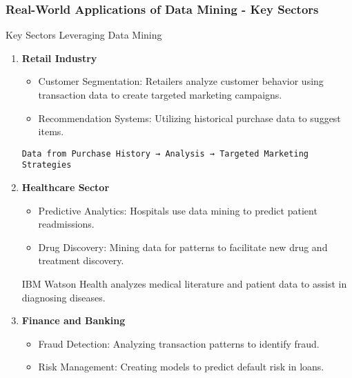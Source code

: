 \documentclass[aspectratio=169]{beamer}
\begin{document}
\begin{frame}[fragile]
    \frametitle{Real-World Applications of Data Mining - Key Sectors}
    \begin{block}{Key Sectors Leveraging Data Mining}
        \begin{enumerate}
            \item \textbf{Retail Industry}
                \begin{itemize}
                    \item Customer Segmentation: Retailers analyze customer behavior using transaction data to create targeted marketing campaigns.
                    \item Recommendation Systems: Utilizing historical purchase data to suggest items.
                \end{itemize}
                \begin{example}
                    \texttt{Data from Purchase History → Analysis → Targeted Marketing Strategies}
                \end{example}

            \item \textbf{Healthcare Sector}
                \begin{itemize}
                    \item Predictive Analytics: Hospitals use data mining to predict patient readmissions.
                    \item Drug Discovery: Mining data for patterns to facilitate new drug and treatment discovery.
                \end{itemize}
                \begin{example}
                    IBM Watson Health analyzes medical literature and patient data to assist in diagnosing diseases.
                \end{example}

            \item \textbf{Finance and Banking}
                \begin{itemize}
                    \item Fraud Detection: Analyzing transaction patterns to identify fraud.
                    \item Risk Management: Creating models to predict default risk in loans.
                \end{itemize}
            \end{enumerate}
    \end{block}
\end{frame}
\end{document}
